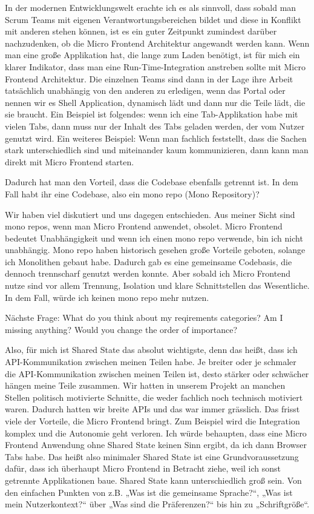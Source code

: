 \begin{description}
    \BerndOlleck In der modernen Entwicklungswelt erachte ich es als sinnvoll, dass sobald man Scrum Teams mit eigenen Verantwortungsbereichen bildet und diese in Konflikt mit anderen stehen können, ist es ein guter Zeitpunkt zumindest darüber nachzudenken, ob die Micro Frontend Architektur angewandt werden kann. Wenn man eine große Applikation hat, die lange zum Laden benötigt, ist für mich ein klarer Indikator, dass man eine Run-Time-Integration anstreben sollte mit Micro Frontend Architektur. Die einzelnen Teams sind dann in der Lage ihre Arbeit tatsächlich unabhängig von den anderen zu erledigen, wenn das Portal oder nennen wir es Shell Application, dynamisch lädt und dann nur die Teile lädt, die sie braucht. Ein Beispiel ist folgendes: wenn ich eine Tab-Applikation habe mit vielen Tabs, dann muss nur der Inhalt des Tabs geladen werden, der vom Nutzer genutzt wird.
    Ein weiteres Beispiel: Wenn man fachlich feststellt, dass die Sachen stark unterschiedlich sind und miteinander kaum kommunizieren, dann kann man direkt mit Micro Frontend starten.

    \NicoVogel Dadurch hat man den Vorteil, dass die Codebase ebenfalls getrennt ist. In dem Fall habt ihr eine Codebase, also ein mono repo (Mono Repository)?

    \BerndOlleck Wir haben viel diskutiert und uns dagegen entschieden. Aus meiner Sicht sind mono repos, wenn man Micro Frontend anwendet, obsolet. Micro Frontend bedeutet Unabhängigkeit und wenn ich einen mono repo verwende, bin ich nicht unabhängig.
    Mono repo haben historisch gesehen große Vorteile geboten, solange ich Monolithen gebaut habe. Dadurch gab es eine gemeinsame Codebasis, die dennoch trennscharf genutzt werden konnte.
    Aber sobald ich Micro Frontend nutze sind vor allem Trennung, Isolation und klare Schnittstellen das Wesentliche. In dem Fall, würde ich keinen mono repo mehr nutzen.

    \NicoVogel Nächste Frage: What do you think about my reqirements categories? Am I missing anything? Would you change the order of importance?

    \BerndOlleck Also, für mich ist Shared State das absolut wichtigste, denn das heißt, dass ich API-Kommunikation zwischen meinen Teilen habe. Je breiter oder je schmaler die API-Kommunikation zwischen meinen Teilen ist, desto stärker oder schwächer hängen meine Teile zusammen.
    Wir hatten in unserem Projekt an manchen Stellen politisch motivierte Schnitte, die weder fachlich noch technisch motiviert waren. Dadurch hatten wir breite APIs und das war immer grässlich. Das frisst viele der Vorteile, die Micro Frontend bringt. Zum Beispiel wird die Integration komplex und die Autonomie geht verloren. Ich würde behaupten, dass eine Micro Frontend Anwendung ohne Shared State keinen Sinn ergibt, da ich dann Browser Tabs habe. Das heißt also minimaler Shared State ist eine Grundvoraussetzung dafür, dass ich überhaupt Micro Frontend in Betracht ziehe, weil ich sonst getrennte Applikationen baue. Shared State kann unterschiedlich groß sein. Von den einfachen Punkten von z.B. „Was ist die gemeinsame Sprache?“, „Was ist mein Nutzerkontext?“ über „Was sind die Präferenzen?“ bis hin zu „Schriftgröße“.


\end{description}
